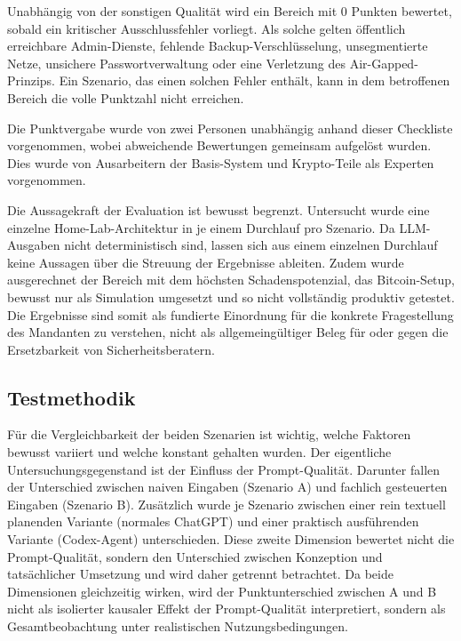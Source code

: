 Unabhängig von der sonstigen Qualität wird ein Bereich mit 0 Punkten bewertet, sobald ein kritischer Ausschlussfehler vorliegt. Als solche gelten öffentlich erreichbare Admin-Dienste, fehlende Backup-Verschlüsselung, unsegmentierte Netze, unsichere Passwortverwaltung oder eine Verletzung des Air-Gapped-Prinzips. 
Ein Szenario, das einen solchen Fehler enthält, kann in dem betroffenen Bereich die volle Punktzahl nicht erreichen.

Die Punktvergabe wurde von zwei Personen unabhängig anhand dieser Checkliste vorgenommen, wobei abweichende Bewertungen gemeinsam aufgelöst wurden. Dies wurde von Ausarbeitern der Basis-System und Krypto-Teile als Experten vorgenommen.

Die Aussagekraft der Evaluation ist bewusst begrenzt. 
Untersucht wurde eine einzelne Home-Lab-Architektur in je einem Durchlauf pro Szenario. Da \acs{LLM}-Ausgaben nicht deterministisch sind, lassen sich aus einem einzelnen Durchlauf keine Aussagen über die Streuung der Ergebnisse ableiten. Zudem wurde ausgerechnet der Bereich mit dem höchsten Schadenspotenzial, das Bitcoin-Setup, bewusst nur als Simulation umgesetzt und so nicht vollständig produktiv getestet. Die Ergebnisse sind somit als fundierte Einordnung für die konkrete Fragestellung des Mandanten zu verstehen, nicht als allgemeingültiger Beleg für oder gegen die Ersetzbarkeit von Sicherheitsberatern.

\subsection{Testmethodik}

Für die Vergleichbarkeit der beiden Szenarien ist wichtig, welche Faktoren bewusst variiert und welche konstant gehalten wurden. 
Der eigentliche Untersuchungsgegenstand ist der Einfluss der Prompt-Qualität. Darunter fallen der Unterschied zwischen naiven Eingaben (Szenario A) und fachlich gesteuerten Eingaben (Szenario B). 
Zusätzlich wurde je Szenario zwischen einer rein textuell planenden Variante (normales ChatGPT) und einer praktisch ausführenden Variante (Codex-Agent) unterschieden. 
Diese zweite Dimension bewertet nicht die Prompt-Qualität, sondern den Unterschied zwischen Konzeption und tatsächlicher Umsetzung und wird daher getrennt betrachtet. 
Da beide Dimensionen gleichzeitig wirken, wird der Punktunterschied zwischen A und B nicht als isolierter kausaler Effekt der Prompt-Qualität interpretiert, sondern als Gesamtbeobachtung unter realistischen Nutzungsbedingungen.


